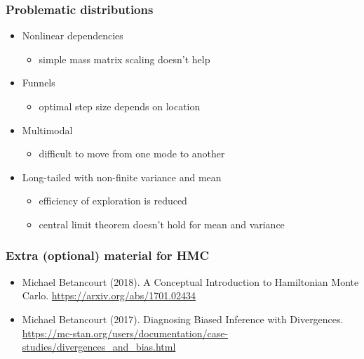 \documentclass[10pt]{beamer}
\begin{document}
\begin{frame}
\begin{itemize}
  \end{itemize}
\end{frame}


\begin{frame}

\frametitle{Problematic distributions}

  \begin{itemize}
  \item<1-> Nonlinear dependencies
    \begin{itemize}
    \item simple mass matrix scaling doesn't help
    \end{itemize}
  \item<2-> Funnels
    \begin{itemize}
    \item optimal step size depends on location
    \end{itemize}
  \item<3-> Multimodal
    \begin{itemize}
    \item difficult to move from one mode to another
    \end{itemize}
  \item<4-> Long-tailed with non-finite variance and mean
    \begin{itemize}
    \item efficiency of exploration is reduced
    \item central limit theorem doesn't hold for mean and variance
    \end{itemize}
  \end{itemize}

\end{frame}


\begin{frame}

\frametitle{Extra (optional) material for HMC}

  \begin{itemize}
  \item Michael Betancourt (2018).  A Conceptual Introduction to
    Hamiltonian Monte Carlo. \url{https://arxiv.org/abs/1701.02434}
  \item Michael Betancourt (2017).  Diagnosing Biased Inference with Divergences. \url{https://mc-stan.org/users/documentation/case-studies/divergences_and_bias.html}
  \end{itemize}

\end{frame}
\end{document}
